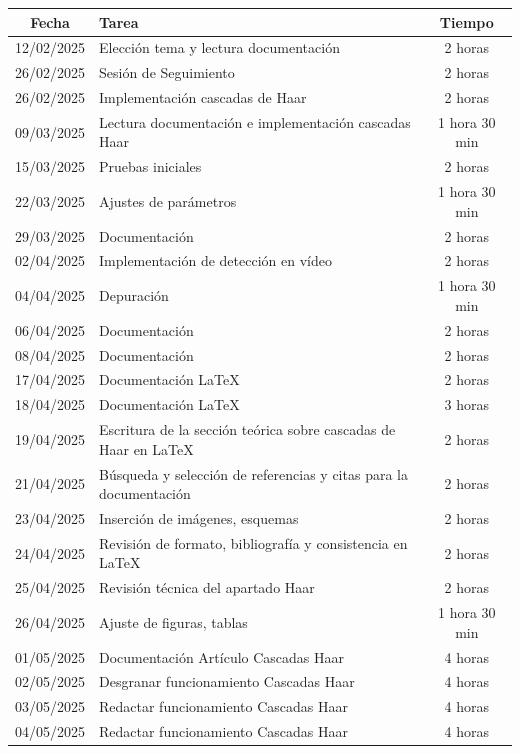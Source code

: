 \documentclass[a4paper]{article}
\begin{document}
\begin{table}[H]
    \centering
    \begin{tabular}{|c|p{10cm}|c|}
    \hline
    \textbf{Fecha} & \textbf{Tarea} & \textbf{Tiempo} \\
    \hline
    12/02/2025 & Elección tema y lectura documentación & 2 horas \\
    26/02/2025 & Sesión de Seguimiento & 2 horas \\
    26/02/2025 & Implementación cascadas de Haar & 2 horas \\
    09/03/2025 & Lectura documentación e implementación cascadas Haar & 1 hora 30 min \\
    15/03/2025 & Pruebas iniciales & 2 horas \\
    22/03/2025 & Ajustes de parámetros & 1 hora 30 min \\
    29/03/2025 & Documentación & 2 horas \\
    02/04/2025 & Implementación de detección en vídeo & 2 horas \\
    04/04/2025 & Depuración & 1 hora 30 min \\
    06/04/2025 & Documentación & 2 horas \\
    08/04/2025 & Documentación & 2 horas \\
    17/04/2025 & Documentación LaTeX & 2 horas \\
    18/04/2025 & Documentación LaTeX & 3 horas \\
    19/04/2025 & Escritura de la sección teórica sobre cascadas de Haar en LaTeX & 2 horas \\
    21/04/2025 & Búsqueda y selección de referencias y citas para la documentación & 2 horas \\
    23/04/2025 & Inserción de imágenes, esquemas & 2 horas \\
    24/04/2025 & Revisión de formato, bibliografía y consistencia en LaTeX & 2 horas \\
    25/04/2025 & Revisión técnica del apartado Haar & 2 horas \\
    26/04/2025 & Ajuste de figuras, tablas & 1 hora 30 min \\
    01/05/2025 & Documentación Artículo Cascadas Haar & 4 horas \\
    02/05/2025 & Desgranar funcionamiento Cascadas Haar & 4 horas \\
    03/05/2025 & Redactar funcionamiento Cascadas Haar & 4 horas \\
    04/05/2025 & Redactar funcionamiento Cascadas Haar & 4 horas \\

\end{tabular}
\end{table}
\end{document}
